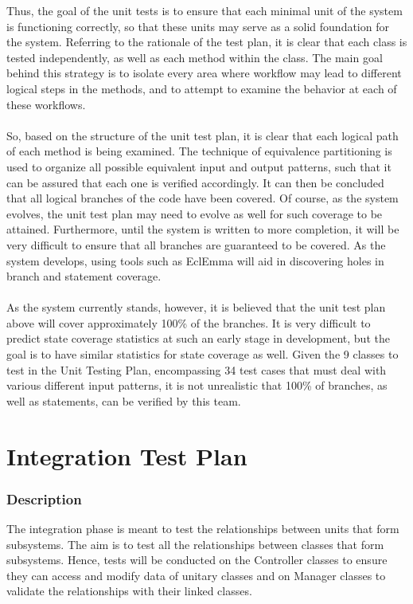 \documentclass[12pt]{report}
\begin{document}
    Thus, the goal of the unit tests is to ensure that each minimal unit of the system is
    functioning correctly, so that these units may serve as a solid foundation for the system.
    Referring to the rationale of the test plan, it is clear that each class is tested
    independently, as well as each method within the class. The main goal behind this strategy is to
    isolate every area where workflow may lead to different logical steps in the methods, and to
    attempt to examine the behavior at each of these workflows.\\\\
    So, based on the structure of the unit test plan, it is clear that each logical path of each
    method is being examined. The technique of equivalence partitioning is used to organize all
    possible equivalent input and output patterns, such that it can be assured that each one is
    verified accordingly. It can then be concluded that all logical
    branches of the code have been covered. Of course, as the system evolves, the unit test plan may
    need to evolve as well for such coverage to be attained. Furthermore, until the system is
    written to more completion, it will be very difficult to ensure that all branches are guaranteed
    to be covered. As the system develops, using tools such as EclEmma will aid in discovering holes
    in branch and statement coverage.\\\\
    As the system currently stands, however, it is believed that the unit test plan above will cover
    approximately 100\% of the branches. It is very difficult to predict state coverage statistics
    at such an early stage in development, but the goal is to have similar statistics for state
    coverage as well. Given the 9 classes to test in the Unit Testing Plan, encompassing 34 test
    cases that must deal with various different input patterns, it is not unrealistic that 100\% of
    branches, as well as statements, can be verified by this team.
    
\part{Integration Test Plan}
\section{Description}
The integration phase is meant to test the relationships between units that form
subsystems. The aim is to test all the relationships between classes that form subsystems. Hence, tests will be conducted on the Controller classes to ensure they can access and modify data of unitary classes and on Manager classes to validate the relationships with their linked classes.
\end{document}

